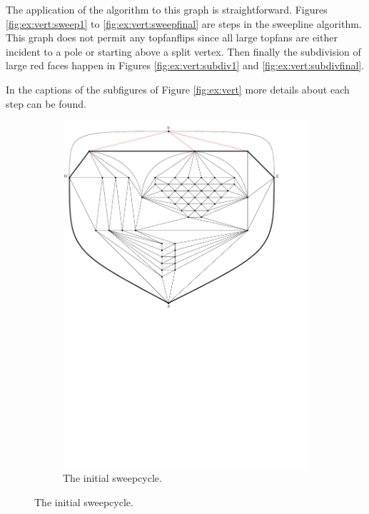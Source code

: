 The application of the algorithm to this graph is straightforward. Figures \ref{fig:ex:vert:sweep1} to \ref{fig:ex:vert:sweepfinal} are steps in the sweepline algorithm. This graph does not permit any topfanflips since all large topfans are either incident to a pole or starting above a split vertex. 
Then finally the subdivision of large red faces happen in Figures \ref{fig:ex:vert:subdiv1} and \ref{fig:ex:vert:subdivfinal}.

In the captions of the subfigures of Figure \ref{fig:ex:vert} more details about each step can be found.


\begin{figure}
    \centering
    \begin{subfigure}[b]{.9 \textwidth}
      \includegraphics[width=\textwidth]{examples/img/vertWorstCase/sweep1}
      \caption{The initial sweepcycle.}

\end{subfigure}
\end{figure}
